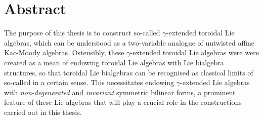 \section*{Abstract}
    The purpose of this thesis is to construct so-called $\gamma$-extended toroidal Lie algebras, which can be understood as a two-variable analogue of untwisted affine Kac-Moody algebras. Ostensibly, these $\gamma$-extended toroidal Lie algebras were were created as a mean of endowing toroidal Lie algebras with Lie bialgebra structures, so that toroidal Lie bialgebras can be recognised as classical limits of so-called  in a certain sense. This necessitates endowing $\gamma$-extended Lie algebras with \textit{non-degenerated} and \textit{invariant} symmetric bilinear forms, a prominent feature of these Lie algebras that will play a crucial role in the constructions carried out in this thesis.